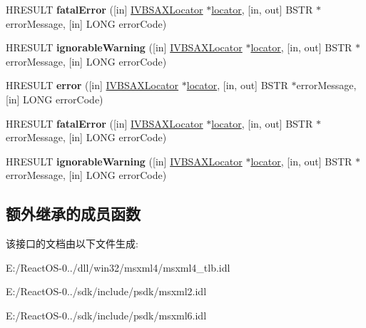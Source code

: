 \begin{DoxyCompactItemize}
H\+R\+E\+S\+U\+LT {\bfseries fatal\+Error} (\mbox{[}in\mbox{]} \hyperlink{interface_m_s_x_m_l2_1_1_i_v_b_s_a_x_locator}{I\+V\+B\+S\+A\+X\+Locator} $\ast$\hyperlink{structlocator}{locator}, \mbox{[}in, out\mbox{]} B\+S\+TR $\ast$error\+Message, \mbox{[}in\mbox{]} L\+O\+NG error\+Code)
\item 
\mbox{\label{interface_m_s_x_m_l2_1_1_i_v_b_s_a_x_error_handler_ae59932ade52d66064600d6202218f681}} 
H\+R\+E\+S\+U\+LT {\bfseries ignorable\+Warning} (\mbox{[}in\mbox{]} \hyperlink{interface_m_s_x_m_l2_1_1_i_v_b_s_a_x_locator}{I\+V\+B\+S\+A\+X\+Locator} $\ast$\hyperlink{structlocator}{locator}, \mbox{[}in, out\mbox{]} B\+S\+TR $\ast$error\+Message, \mbox{[}in\mbox{]} L\+O\+NG error\+Code)
\item 
\mbox{\label{interface_m_s_x_m_l2_1_1_i_v_b_s_a_x_error_handler_a75484ed42710e63492381debbc3aa62a}} 
H\+R\+E\+S\+U\+LT {\bfseries error} (\mbox{[}in\mbox{]} \hyperlink{interface_m_s_x_m_l2_1_1_i_v_b_s_a_x_locator}{I\+V\+B\+S\+A\+X\+Locator} $\ast$\hyperlink{structlocator}{locator}, \mbox{[}in, out\mbox{]} B\+S\+TR $\ast$error\+Message, \mbox{[}in\mbox{]} L\+O\+NG error\+Code)
\item 
\mbox{\label{interface_m_s_x_m_l2_1_1_i_v_b_s_a_x_error_handler_a6bda3206f210ca18f622c75eecf885bc}} 
H\+R\+E\+S\+U\+LT {\bfseries fatal\+Error} (\mbox{[}in\mbox{]} \hyperlink{interface_m_s_x_m_l2_1_1_i_v_b_s_a_x_locator}{I\+V\+B\+S\+A\+X\+Locator} $\ast$\hyperlink{structlocator}{locator}, \mbox{[}in, out\mbox{]} B\+S\+TR $\ast$error\+Message, \mbox{[}in\mbox{]} L\+O\+NG error\+Code)
\item 
\mbox{\label{interface_m_s_x_m_l2_1_1_i_v_b_s_a_x_error_handler_ae59932ade52d66064600d6202218f681}} 
H\+R\+E\+S\+U\+LT {\bfseries ignorable\+Warning} (\mbox{[}in\mbox{]} \hyperlink{interface_m_s_x_m_l2_1_1_i_v_b_s_a_x_locator}{I\+V\+B\+S\+A\+X\+Locator} $\ast$\hyperlink{structlocator}{locator}, \mbox{[}in, out\mbox{]} B\+S\+TR $\ast$error\+Message, \mbox{[}in\mbox{]} L\+O\+NG error\+Code)
\end{DoxyCompactItemize}
\subsection*{额外继承的成员函数}


该接口的文档由以下文件生成\+:\begin{DoxyCompactItemize}
\item 
E\+:/\+React\+O\+S-\/0../dll/win32/msxml4/msxml4\+\_\+tlb.\+idl\item 
E\+:/\+React\+O\+S-\/0../sdk/include/psdk/msxml2.\+idl\item 
E\+:/\+React\+O\+S-\/0../sdk/include/psdk/msxml6.\+idl\end{DoxyCompactItemize}
